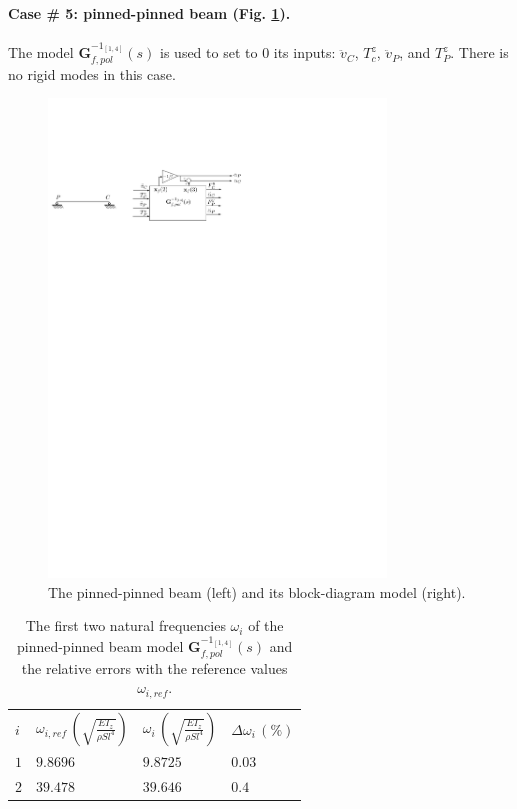 \documentclass[smallcondensed]{svjour3}     %
\begin{document}
\FloatBarrier
\paragraph{Case \# 5: pinned-pinned beam (Fig. \ref{fig:Tpp}).} The model $\mathbf{G}_{f,pol}^{-1_{[1,4]}}(s)$ is used to set to $0$ its inputs: $\ddot{v}_C$, $T^z_c$, $\ddot{v}_P$, and $T^z_P$. There is no rigid modes in this case.
\begin{figure}[htbp!]
  \includegraphics[width=0.8\textwidth]{Tppb}
\caption{The pinned-pinned beam (left) and its block-diagram model (right).}
\label{fig:Tpp} 
\end{figure}
\begin{table}[htbp!]
\caption{The first two natural frequencies $\omega_i$ of the pinned-pinned beam model $\mathbf{G}_{f,pol}^{-1_{[1,4]}}(s)$ and the relative errors with the reference values $\omega_{i,ref}$.}
\label{tab:Tpp}       %
\begin{tabular}{llll}
\hline\noalign{\smallskip}
  $i$ & $\omega_{i,ref}\,\left(\sqrt{\frac{EI_z}{\rho S l^4}}\right)$ &  $\omega_i\,\left(\sqrt{\frac{EI_z}{\rho S l^4}}\right)$ &  $\Delta \omega_i\,(\%)$ \\
\noalign{\smallskip}\hline\noalign{\smallskip}
$1$ & $9.8696$ & $9.8725$  & $0.03$ \\ 
$2$ & $39.478$ & $39.646$ & $0.4$ \\
\hline
\end{tabular}
\end{table}
\end{document}
